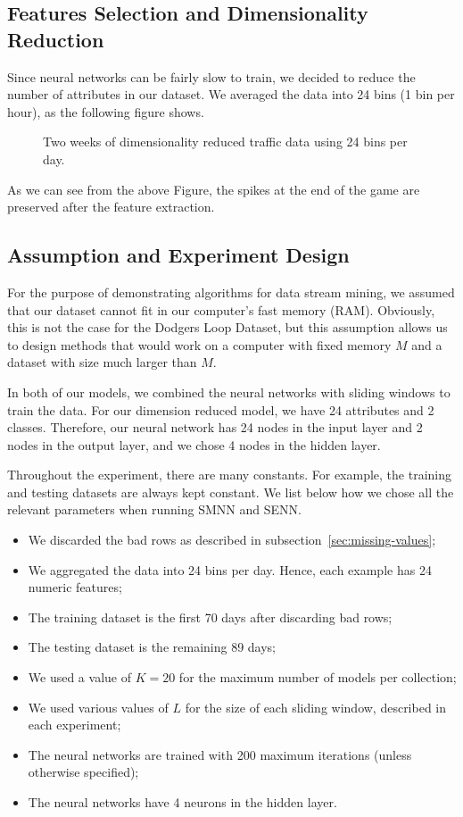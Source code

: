 \documentclass[conference]{IEEEtran}
\begin{document}
		\subsection{Features Selection and Dimensionality Reduction}
		Since neural networks can be fairly slow to train, we decided to reduce the number of attributes in our dataset. We averaged the data into 24 bins (1 bin per hour), as the following figure shows.
		
		\begin{figure}[H]
			\caption{Two weeks of dimensionality reduced traffic data using 24 bins per day.}
			\label{fig:two-weeks-reduced-dimensionality}
		\end{figure}
		As we can see from the above Figure, the spikes at the end of the game are preserved after the feature extraction.
		
		\subsection{Assumption and Experiment Design}
		For the purpose of demonstrating algorithms for data stream mining, we assumed that our dataset cannot fit in our computer's fast memory (RAM). Obviously, this is not the case for the Dodgers Loop Dataset, but this assumption allows us to design methods that would work on a computer with fixed memory $M$ and a dataset with size much larger than $M$.
		
		In both of our models, we combined the neural networks with sliding windows to train the data. For our dimension reduced model, we have 24 attributes and 2 classes. Therefore, our neural network has 24 nodes in the input layer and 2 nodes in the output layer, and we chose 4 nodes in the hidden layer. 
		
		Throughout the experiment, there are many constants. For example, the training and testing datasets are always kept constant. We list below how we chose all the relevant parameters when running SMNN and SENN. 
		\begin{itemize}
			\item We discarded the bad rows as described in subsection~\ref{sec:missing-values};
			\item We aggregated the data into 24 bins per day. Hence, each example has 24 numeric features;
			\item The training dataset is the first 70 days after discarding bad rows;
			\item The testing dataset is the remaining 89 days;
			\item We used a value of $K=20$ for the maximum number of models per collection;
			\item We used various values of $L$ for the size of each sliding window, described in each experiment;
			\item The neural networks are trained with 200 maximum iterations (unless otherwise specified);
			\item The neural networks have 4 neurons in the hidden layer.
		\end{itemize}
		
\end{document}
